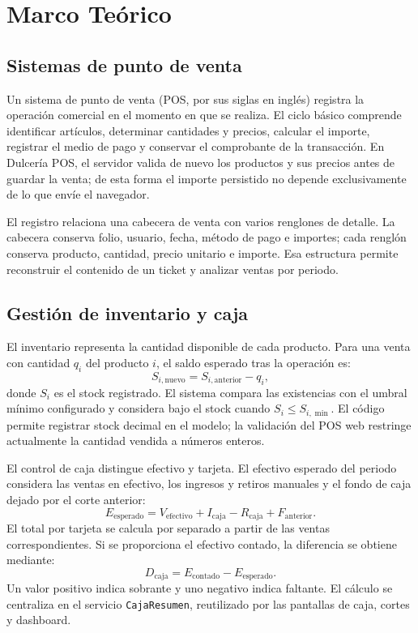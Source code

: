 \chapter{Marco Teórico}

\section{Sistemas de punto de venta}

Un sistema de punto de venta (POS, por sus siglas en inglés) registra la operación comercial en el momento en que se realiza. El ciclo básico comprende identificar artículos, determinar cantidades y precios, calcular el importe, registrar el medio de pago y conservar el comprobante de la transacción. En Dulcería POS, el servidor valida de nuevo los productos y sus precios antes de guardar la venta; de esta forma el importe persistido no depende exclusivamente de lo que envíe el navegador.

El registro relaciona una cabecera de venta con varios renglones de detalle. La cabecera conserva folio, usuario, fecha, método de pago e importes; cada renglón conserva producto, cantidad, precio unitario e importe. Esa estructura permite reconstruir el contenido de un ticket y analizar ventas por periodo.

\section{Gestión de inventario y caja}

El inventario representa la cantidad disponible de cada producto. Para una venta con cantidad \(q_i\) del producto \(i\), el saldo esperado tras la operación es:
\[
  S_{i,\mathrm{nuevo}} = S_{i,\mathrm{anterior}} - q_i,
\]
donde \(S_i\) es el stock registrado. El sistema compara las existencias con el umbral mínimo configurado y considera bajo el stock cuando \(S_i \leq S_{i,\min}\). El código permite registrar stock decimal en el modelo; la validación del POS web restringe actualmente la cantidad vendida a números enteros.

El control de caja distingue efectivo y tarjeta. El efectivo esperado del periodo considera las ventas en efectivo, los ingresos y retiros manuales y el fondo de caja dejado por el corte anterior:
\[
  E_{\mathrm{esperado}} =
  V_{\mathrm{efectivo}} + I_{\mathrm{caja}} - R_{\mathrm{caja}} + F_{\mathrm{anterior}}.
\]
El total por tarjeta se calcula por separado a partir de las ventas correspondientes. Si se proporciona el efectivo contado, la diferencia se obtiene mediante:
\[
  D_{\mathrm{caja}} = E_{\mathrm{contado}} - E_{\mathrm{esperado}}.
\]
Un valor positivo indica sobrante y uno negativo indica faltante. El cálculo se centraliza en el servicio \texttt{CajaResumen}, reutilizado por las pantallas de caja, cortes y dashboard.


